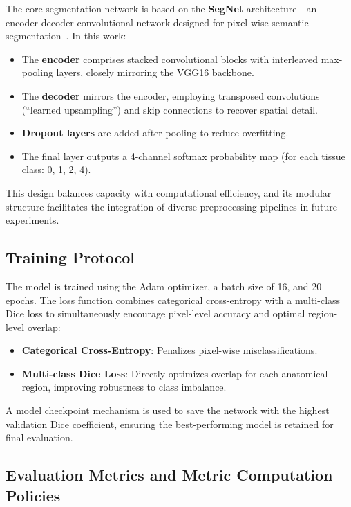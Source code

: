 The core segmentation network is based on the \textbf{SegNet} architecture---an encoder-decoder convolutional network designed for pixel-wise semantic segmentation~\cite{badrinarayanan2017segnet}. In this work:
\begin{itemize}
    \item The \textbf{encoder} comprises stacked convolutional blocks with interleaved max-pooling layers, closely mirroring the VGG16 backbone.
    \item The \textbf{decoder} mirrors the encoder, employing transposed convolutions (``learned upsampling'') and skip connections to recover spatial detail.
    \item \textbf{Dropout layers} are added after pooling to reduce overfitting.
    \item The final layer outputs a 4-channel softmax probability map (for each tissue class: 0, 1, 2, 4).
\end{itemize}
This design balances capacity with computational efficiency, and its modular structure facilitates the integration of diverse preprocessing pipelines in future experiments.

\subsection{Training Protocol}
\label{sec:training_protocol}

The model is trained using the Adam optimizer, a batch size of 16, and 20 epochs. The loss function combines categorical cross-entropy with a multi-class Dice loss to simultaneously encourage pixel-level accuracy and optimal region-level overlap:
\begin{itemize}
    \item \textbf{Categorical Cross-Entropy}: Penalizes pixel-wise misclassifications.
    \item \textbf{Multi-class Dice Loss}: Directly optimizes overlap for each anatomical region, improving robustness to class imbalance.
\end{itemize}
A model checkpoint mechanism is used to save the network with the highest validation Dice coefficient, ensuring the best-performing model is retained for final evaluation.

\subsection{Evaluation Metrics and Metric Computation Policies}
\label{sec:evaluation_metrics}

